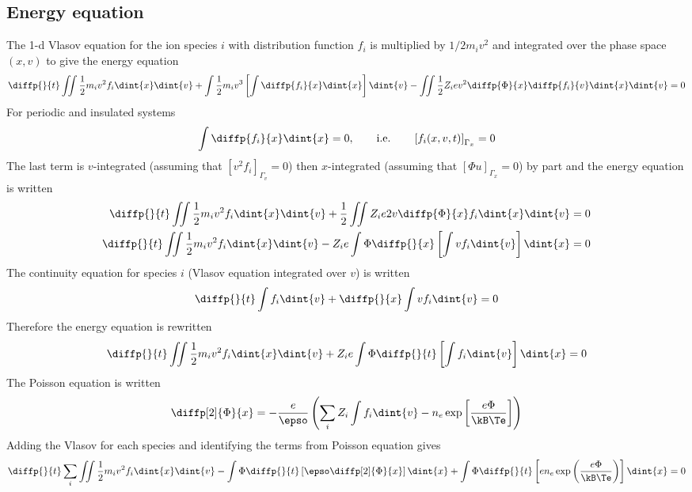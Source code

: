 \documentclass[10pt,a4paper]{article}
\begin{document}
\subsection{Energy equation}
The 1-d Vlasov equation for the ion species $i$ with distribution function
$f_i$ is multiplied by $1/2m_iv^2$
and integrated over the phase space $(x,v)$ to give the energy equation
\begin{equation}
\diffp{}{t}\iint\frac{1}{2}m_iv^2f_i\dint{x}\dint{v}+
\int\frac{1}{2}m_iv^3\left[\int\diffp{f_i}{x}\dint{x}\right]
\dint{v}-\iint\frac{1}{2}Z_iev^2\diffp{\Phi}{x}
\diffp{f_i}{v}\dint{x}\dint{v}=0
\end{equation}
For periodic and insulated systems
\begin{equation}
\int\diffp{f_i}{x}\dint{x}=0,\qquad\mbox{i.e.}\qquad
\left[f_i(x,v,t)\right]_{\Gamma_x}=0
\end{equation}
The last term is $v$-integrated (assuming that 
$[v^2 f_i]_{\Gamma_v}=0$)
then $x$-integrated (assuming that $[\Phi u]_{\Gamma_x}=0$)
by part and the energy equation is written
\begin{align}
\diffp{}{t}\iint\frac{1}{2}m_iv^2f_i\dint{x}\dint{v}+
\frac{1}{2}\iint Z_ie2v\diffp{\Phi}{x}f_i\dint{x}\dint{v}&=0\\
\diffp{}{t}\iint\frac{1}{2}m_iv^2f_i\dint{x}\dint{v}-Z_ie
\int\Phi\diffp{}{x}\left[\int vf_i\dint{v}\right]\dint{x}&=0
\end{align}
The continuity equation for species $i$ (Vlasov equation integrated over
$v$) is written
\begin{equation}
\diffp{}{t}\int f_i\dint{v}+\diffp{}{x}\int vf_i\dint{v}=0
\end{equation}
Therefore the energy equation is rewritten
\begin{equation}
\diffp{}{t}\iint\frac{1}{2}m_iv^2f_i\dint{x}\dint{v}+Z_ie
\int\Phi\diffp{}{t}\left[\int f_i\dint{v}\right]\dint{x}=0
\end{equation}
The Poisson equation is written
\begin{equation}
\diffp[2]{\Phi}{x}=-\frac{e}{\epso}
\left(\sum_iZ_i\int f_i\dint{v}-n_e\exp\left[\frac{e\Phi}{\kB\Te}\right]\right)
\end{equation}
Adding the Vlasov for each species and identifying the terms from Poisson
equation gives
\begin{equation}
\diffp{}{t}\sum_i\iint\frac{1}{2}m_iv^2f_i\dint{x}\dint{v}-
\int\Phi\diffp{}{t}\left[\epso\diffp[2]{\Phi}{x}\right]\dint{x}+
\int\Phi\diffp{}{t}\left[en_e\exp\left(\frac{e\Phi}{\kB\Te}\right)\right]
\dint{x}=0
\end{equation}
\end{document}
